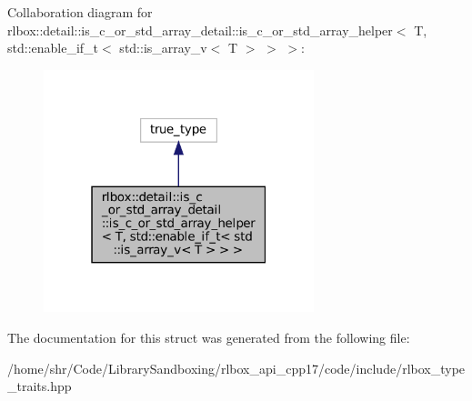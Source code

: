 Collaboration diagram for rlbox\+:\+:detail\+:\+:is\+\_\+c\+\_\+or\+\_\+std\+\_\+array\+\_\+detail\+:\+:is\+\_\+c\+\_\+or\+\_\+std\+\_\+array\+\_\+helper$<$ T, std\+:\+:enable\+\_\+if\+\_\+t$<$ std\+:\+:is\+\_\+array\+\_\+v$<$ T $>$ $>$ $>$\+:\nopagebreak
\begin{figure}[H]
\begin{center}
\leavevmode
\includegraphics[width=223pt]{structrlbox_1_1detail_1_1is__c__or__std__array__detail_1_1is__c__or__std__array__helper_3_01T_00e165179d6402fff81dafd61404964f06}
\end{center}
\end{figure}


The documentation for this struct was generated from the following file\+:\begin{DoxyCompactItemize}
\item 
/home/shr/\+Code/\+Library\+Sandboxing/rlbox\+\_\+api\+\_\+cpp17/code/include/rlbox\+\_\+type\+\_\+traits.\+hpp\end{DoxyCompactItemize}
